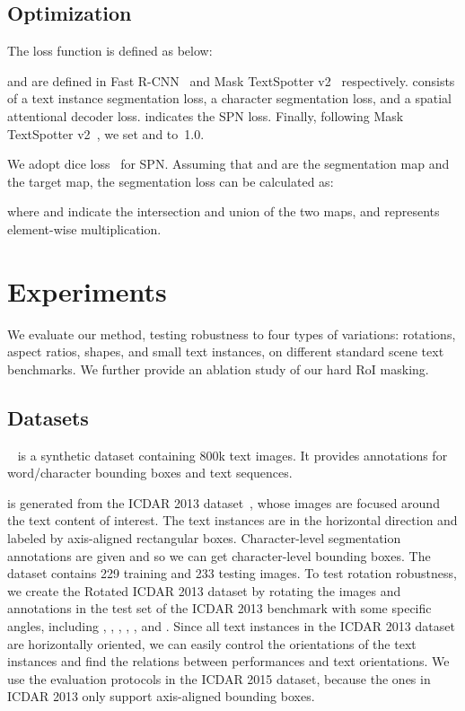 \documentclass[runningheads]{llncs}
\newcommand{\minisection}[1]{\noindent{\textbf{#1}}}
\newcommand{\minienumerate}[1]{\noindent{\textbf{#1}}}
\begin{document}
\subsection{Optimization}
The loss function  is defined as below:

 and  are defined in Fast R-CNN~\cite{fastrcnn} and Mask TextSpotter v2~\cite{liao2019mask} respectively.  consists of a text instance segmentation loss, a character segmentation loss, and a spatial attentional decoder loss.  indicates the SPN loss. Finally, following Mask TextSpotter v2~\cite{liao2019mask}, we set  and  to~1.0.

We adopt dice loss~\cite{milletari2016v} for SPN. Assuming that  and  are the segmentation map and the target map, the segmentation loss  can be calculated as:

where  and  indicate the intersection and union of the two maps, and  represents element-wise multiplication.

\section{Experiments}
We evaluate our method, testing robustness to four types of variations: rotations, aspect ratios, shapes, and small text instances, on different standard scene text benchmarks.
We further provide an ablation study of our hard RoI masking.

\subsection{Datasets}
\minienumerate{SynthText}~\cite{gupta2016synthetic} is a synthetic dataset containing 800k text images. It provides annotations for word/character bounding boxes and text sequences.

\minisection{Rotated ICDAR 2013 dataset (RoIC13)} is generated from the ICDAR 2013 dataset~\cite{karatzas2013icdar}, whose images are focused around the text content of interest. The text instances are in the horizontal direction and labeled by axis-aligned rectangular boxes. Character-level segmentation annotations are given and so we can get character-level bounding boxes. The dataset contains 229 training and 233 testing images. 
To test rotation robustness, we create the Rotated ICDAR 2013 dataset by rotating the images and annotations in the test set of the ICDAR 2013 benchmark with some specific angles, including , , , , , and . Since all text instances in the ICDAR 2013 dataset are horizontally oriented, we can easily control the orientations of the text instances and find the relations between performances and text orientations. We use the evaluation protocols in the ICDAR 2015 dataset, because the ones in ICDAR 2013 only support axis-aligned bounding boxes.
\end{document}
